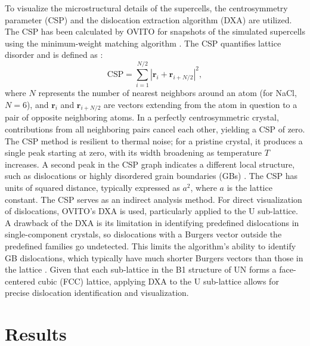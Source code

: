 \documentclass[preprint,12pt,sort&compress]{elsarticle} %
\newcommand{\?}{\stackrel{?}{=}}
\providecommand{\DIFaddbegin}{\protect\color{blue}} %
\providecommand{\DIFaddend}{\protect\color{black}} %
\providecommand{\DIFdelbegin}{\protect\color{red}} %
\providecommand{\DIFdelend}{\protect\color{black}} %
\newcommand{\DIFscaledelfig}{0.5}
\newlength{\DIFdelgraphicswidth} %
\newlength{\DIFdelgraphicsheight} %
\newcommand{\DIFaddincludegraphics}[2][]{{\color{blue}\fbox{\DIFOincludegraphics[#1]{#2}}}} %
\newcommand{\DIFdelincludegraphics}[2][]{%
\sbox{\DIFdelgraphicsbox}{\DIFOincludegraphics[#1]{#2}}%
\settoboxwidth{\DIFdelgraphicswidth}{\DIFdelgraphicsbox} %
\settoboxtotalheight{\DIFdelgraphicsheight}{\DIFdelgraphicsbox} %
\scalebox{\DIFscaledelfig}{%
\parbox[b]{\DIFdelgraphicswidth}{\usebox{\DIFdelgraphicsbox}\\[-\baselineskip] \rule{\DIFdelgraphicswidth}{0em}}\llap{\resizebox{\DIFdelgraphicswidth}{\DIFdelgraphicsheight}{%
\setlength{\unitlength}{\DIFdelgraphicswidth}%
\begin{picture}(1,1)%
\thicklines\linethickness{2pt} %
{\color[rgb]{1,0,0}\put(0,0){\framebox(1,1){}}}%
{\color[rgb]{1,0,0}\put(0,0){\line( 1,1){1}}}%
{\color[rgb]{1,0,0}\put(0,1){\line(1,-1){1}}}%
\end{picture}%
}\hspace*{3pt}}} %
} %
\DeclareRobustCommand{\DIFaddbegin}{\DIFOaddbegin \let\includegraphics\DIFaddincludegraphics} %
\DeclareRobustCommand{\DIFaddend}{\DIFOaddend \let\includegraphics\DIFOincludegraphics} %
\DeclareRobustCommand{\DIFdelbegin}{\DIFOdelbegin \let\includegraphics\DIFdelincludegraphics} %
\DeclareRobustCommand{\DIFdelend}{\DIFOaddend \let\includegraphics\DIFOincludegraphics} %
\begin{document}
To visualize the microstructural details of the supercells, the centrosymmetry parameter (CSP) and the dislocation extraction algorithm (DXA) are utilized. The CSP has been calculated by OVITO for snapshots of the simulated supercells using the minimum-weight matching algorithm \cite{Larsen2020}. The CSP quantifies lattice disorder and is defined as \cite{Kelchner1998}:
\DIFdelbegin %
\DIFdelend \DIFaddbegin \begin{equation}
\mathrm{CSP} = \sum_{i=1}^{N/2} |\mathbf{r}_i + \mathbf{r}_{i+N/2}|^{2},
\end{equation}\DIFaddend 
where $N$ represents the number of nearest neighbors around an atom (for NaCl, $N = 6$), and $\mathbf{r}_i$ and $\mathbf{r}_{i+N/2}$ are vectors extending from the atom in question to a pair of opposite neighboring atoms. In a perfectly centrosymmetric crystal, contributions from all neighboring pairs cancel each other, yielding a CSP of zero. The CSP method is resilient to thermal noise; for a pristine crystal, it produces a single peak starting at zero, with its width broadening as temperature $T$ increases. A second peak in the CSP graph indicates a different local structure, such as dislocations or highly disordered grain boundaries (GBs) \cite{Bulatov2006, Larsen2020}. The CSP has units of squared distance, typically expressed as $a^2$, where $a$ is the lattice constant. The CSP serves as an indirect analysis method. For direct visualization of dislocations, OVITO's DXA \cite{Stukowski2012} is used, particularly applied to the U sub-lattice. A drawback of the DXA is its limitation in identifying predefined dislocations in single-component crystals, so dislocations with a Burgers vector outside the predefined families go undetected. This limits the algorithm's ability to identify GB dislocations, which typically have much shorter Burgers vectors than those in the lattice \cite{Cai2016}. Given that each sub-lattice in the B1 structure of UN forms a face-centered cubic (FCC) lattice, applying DXA to the U sub-lattice allows for precise dislocation identification and visualization.

\section{Results}
\end{document}
